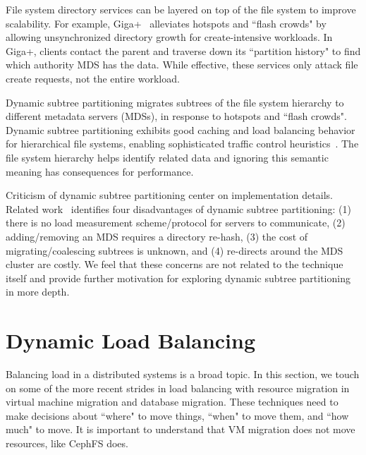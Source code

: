 File system directory services can be layered on top of the file system to improve scalability. For example, Giga+~\cite{patil:fast2011-giga+} alleviates hotspots and ``flash crowds" by allowing unsynchronized directory growth for create-intensive workloads. In Giga+, clients contact the parent and traverse down its ``partition history" to find which authority MDS has the data. While effective, these services only attack file create requests, not the entire workload.  

Dynamic subtree partitioning migrates subtrees of the file system hierarchy to different metadata servers (MDSs), in response to hotspots and ``flash crowds".  Dynamic subtree partitioning exhibits good caching and load balancing behavior for hierarchical file systems, enabling sophisticated traffic control heuristics~\cite{weil:sc2004-dyn-metadata}. The file system hierarchy helps identify related data and ignoring this semantic meaning has consequences for performance. 

Criticism of dynamic subtree partitioning center on implementation details. Related work~\cite{zhu:pds2008-hba, li:msst2006-dynamic} identifies four disadvantages of dynamic subtree partitioning: (1) there is no load measurement scheme/protocol for servers to communicate, (2) adding/removing an MDS requires a directory re-hash, (3) the cost of migrating/coalescing subtrees is unknown, and (4) re-directs around the MDS cluster are costly. We feel that these concerns are not related to the technique itself and provide further motivation for exploring dynamic subtree partitioning in more depth. 

\section{Dynamic Load Balancing}
\label{related-work:heuristics}
Balancing load in a distributed systems is a broad topic. In this section, we touch on some of the more recent strides in load balancing with resource migration in virtual machine migration and database migration. These techniques need to make decisions about ``where" to move things, ``when" to move them, and ``how much" to move. It is important to understand that VM migration does not move resources, like CephFS does.


